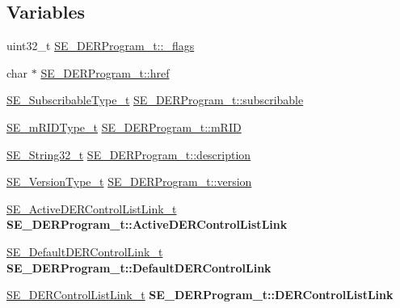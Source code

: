 \subsection*{Variables}
\begin{DoxyCompactItemize}
\item 
uint32\+\_\+t \hyperlink{group__DERProgram_ga9659c1a566294e642a8937f01a8f29a6}{S\+E\+\_\+\+D\+E\+R\+Program\+\_\+t\+::\+\_\+flags}
\item 
char $\ast$ \hyperlink{group__DERProgram_ga41e32b7c2ca6700cd42ba11836b2665e}{S\+E\+\_\+\+D\+E\+R\+Program\+\_\+t\+::href}
\item 
\hyperlink{group__SubscribableType_ga5c41f553d369710ed34619266bf2551e}{S\+E\+\_\+\+Subscribable\+Type\+\_\+t} \hyperlink{group__DERProgram_ga8798269512f178b07f8d02a1cedd6f54}{S\+E\+\_\+\+D\+E\+R\+Program\+\_\+t\+::subscribable}
\item 
\hyperlink{group__mRIDType_gac74622112f3a388a2851b2289963ba5e}{S\+E\+\_\+m\+R\+I\+D\+Type\+\_\+t} \hyperlink{group__DERProgram_ga4d3682f58deb708053b4c09c1c63f58f}{S\+E\+\_\+\+D\+E\+R\+Program\+\_\+t\+::m\+R\+ID}
\item 
\hyperlink{group__String32_gac9f59b06b168b4d2e0d45ed41699af42}{S\+E\+\_\+\+String32\+\_\+t} \hyperlink{group__DERProgram_ga9b079eeab8cef3afd53f741d84d2901d}{S\+E\+\_\+\+D\+E\+R\+Program\+\_\+t\+::description}
\item 
\hyperlink{group__VersionType_ga4b8d27838226948397ed99f67d46e2ae}{S\+E\+\_\+\+Version\+Type\+\_\+t} \hyperlink{group__DERProgram_gaad375ff269dc0a412646ee4e5beeb68d}{S\+E\+\_\+\+D\+E\+R\+Program\+\_\+t\+::version}
\item 
\mbox{\label{group__DERProgram_gaaf68050b7f885230188d7673834fd189}} 
\hyperlink{structSE__ActiveDERControlListLink__t}{S\+E\+\_\+\+Active\+D\+E\+R\+Control\+List\+Link\+\_\+t} {\bfseries S\+E\+\_\+\+D\+E\+R\+Program\+\_\+t\+::\+Active\+D\+E\+R\+Control\+List\+Link}
\item 
\mbox{\label{group__DERProgram_gab81d40aa44defa31b41a65653f4f918d}} 
\hyperlink{structSE__DefaultDERControlLink__t}{S\+E\+\_\+\+Default\+D\+E\+R\+Control\+Link\+\_\+t} {\bfseries S\+E\+\_\+\+D\+E\+R\+Program\+\_\+t\+::\+Default\+D\+E\+R\+Control\+Link}
\item 
\mbox{\label{group__DERProgram_ga2f9b65e5110ec3413ad1843eb1818c62}} 
\hyperlink{structSE__DERControlListLink__t}{S\+E\+\_\+\+D\+E\+R\+Control\+List\+Link\+\_\+t} {\bfseries S\+E\+\_\+\+D\+E\+R\+Program\+\_\+t\+::\+D\+E\+R\+Control\+List\+Link}

\end{DoxyCompactItemize}
